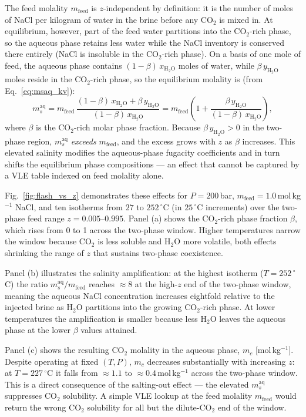\documentclass[preprint,12pt,authoryear]{elsarticle}
\begin{document}
The feed molality $m_\mathrm{feed}$ is $z$-independent by definition: it is the
number of moles of NaCl per kilogram of water in the brine before any CO$_2$
is mixed in.
At equilibrium, however, part of the feed water partitions into the CO$_2$-rich
phase, so the aqueous phase retains less water while the NaCl inventory is
conserved there entirely (NaCl is insoluble in the CO$_2$-rich phase).
On a basis of one mole of feed, the aqueous phase contains $(1-\beta)\,x_{\mathrm{H_2O}}$
moles of water, while $\beta\,y_{\mathrm{H_2O}}$ moles reside in the CO$_2$-rich phase,
so the equilibrium molality is (from Eq.~\ref{eq:msaq_kv}):
\begin{equation*}
  m_s^\mathrm{aq}
    = m_\mathrm{feed}
      \,\frac{(1-\beta)\,x_{\mathrm{H_2O}}+\beta\,y_{\mathrm{H_2O}}}
             {(1-\beta)\,x_{\mathrm{H_2O}}}
    = m_\mathrm{feed}\!\left(1 + \frac{\beta\,y_{\mathrm{H_2O}}}{(1-\beta)\,x_{\mathrm{H_2O}}}\right),
\end{equation*}
where $\beta$ is the CO$_2$-rich molar phase fraction.
Because $\beta\,y_{\mathrm{H_2O}} > 0$ in the two-phase region, $m_s^\mathrm{aq}$
\emph{exceeds} $m_\mathrm{feed}$, and the excess grows with $z$ as $\beta$ increases.
This elevated salinity modifies the aqueous-phase fugacity coefficients and in
turn shifts the equilibrium phase compositions --- an effect that cannot be
captured by a VLE table indexed on feed molality alone.

Fig.~\ref{fig:flash_vs_z} demonstrates these effects for $P = 200$\,bar,
$m_\mathrm{feed} = 1.0$\,mol\,kg$^{-1}$ NaCl, and ten isotherms from $27$ to
$252\,^\circ$C (in $25\,^\circ$C increments) over the two-phase feed range $z = 0.005$--$0.995$.
Panel (a) shows the CO$_2$-rich phase fraction $\beta$, which rises from 0 to 1
across the two-phase window.
Higher temperatures narrow the window because CO$_2$ is less soluble and
H$_2$O more volatile, both effects shrinking the range of $z$ that sustains
two-phase coexistence.

Panel (b) illustrates the salinity amplification: at the highest isotherm
($T = 252\,^\circ$C) the ratio $m_s^\mathrm{aq}/m_\mathrm{feed}$ reaches
$\approx 8$ at the high-$z$ end of the two-phase window, meaning the aqueous
NaCl concentration increases eightfold relative to the injected brine as H$_2$O
partitions into the growing CO$_2$-rich phase.
At lower temperatures the amplification is smaller because less H$_2$O leaves
the aqueous phase at the lower $\beta$ values attained.

Panel (c) shows the resulting CO$_2$ molality in the aqueous phase,
$m_c$ [mol\,kg$^{-1}$].
Despite operating at fixed $(T, P)$, $m_c$ decreases substantially with increasing
$z$: at $T = 227\,^\circ$C it falls from $\approx 1.1$ to $\approx 0.4$\,mol\,kg$^{-1}$
across the two-phase window.
This is a direct consequence of the salting-out effect --- the elevated
$m_s^\mathrm{aq}$ suppresses CO$_2$ solubility.
A simple VLE lookup at the feed molality $m_\mathrm{feed}$ would return the
wrong CO$_2$ solubility for all but the dilute-CO$_2$ end of the window.
\end{document}
